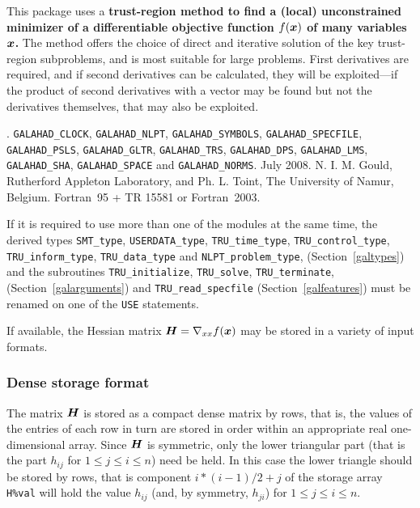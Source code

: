 \documentclass{galahad}
\newcommand{\packagename}{TRU}
\newcommand{\fullpackagename}{\libraryname\_\packagename}
\begin{document}
\galheader


\galsummary
This package uses a {\bf trust-region method to find a (local)
unconstrained minimizer of a differentiable objective function $f({\bm{x}})$
of many variables ${\bm{x}}$.} The method offers the choice of direct
and iterative solution of the key trust-region subproblems, and
is most suitable for large problems. First derivatives are required,
and if second derivatives can be calculated, they will be exploited---if
the product of second derivatives with a vector may be found but
not the derivatives themselves, that may also be exploited.


\galattributes
\galversions{\tt  \fullpackagename\_single, \fullpackagename\_double}.
\galuses
{\tt GALAHAD\_CLOCK},
{\tt GALAHAD\_NLPT},
{\tt GALAHAD\_SY\-M\-BOLS},
{\tt GALAHAD\_SPECFILE},
{\tt GALAHAD\_PSLS},
{\tt GALAHAD\_GLTR},
{\tt GALAHAD\_TRS},
{\tt GALAHAD\_DPS},
{\tt GALAHAD\_LMS},
{\tt GALAHAD\_SHA},
{\tt GALAHAD\_SPACE} and
{\tt GALAHAD\_NORMS}.
\galdate July 2008.
\galorigin N. I. M. Gould, Rutherford Appleton Laboratory,
and Ph. L. Toint, The University of Namur, Belgium.
\gallanguage Fortran~95 + TR 15581 or Fortran~2003.


\galhowto



\noindent
If it is required to use more than one of the modules at the same time, 
the derived types
{\tt SMT\_type},
{\tt USERDATA\_type},
{\tt \packagename\_time\_\-type},
{\tt \packagename\_control\_type},
{\tt \packagename\_inform\_type},
{\tt \packagename\_data\_type}
and
{\tt NLPT\_problem\_type},
(Section~\ref{galtypes})
and the subroutines
{\tt \packagename\_initialize},
{\tt \packagename\_\-solve},
{\tt \packagename\_terminate},
(Section~\ref{galarguments})
and
{\tt \packagename\_read\_specfile}
(Section~\ref{galfeatures})
must be renamed on one of the {\tt USE} statements.


\galmatrix
If available, the Hessian matrix ${\bm{H}} = \nabla_{xx} f({\bm{x}})$
may be stored in a variety of input formats.

\subsubsection{Dense storage format}\label{dense}
The matrix ${\bm{H}}$ is stored as a compact
dense matrix by rows, that is, the values of the entries of each row in turn are
stored in order within an appropriate real one-dimensional array.
Since ${\bm{H}}$ is symmetric, only the lower triangular part (that is the part
$h_{ij}$ for $1 \leq j \leq i \leq n$) need be held. In this case
the lower triangle should be stored by rows, that is
component $i \ast (i-1)/2 + j$ of the storage array {\tt H\%val}
will hold the value $h_{ij}$ (and, by symmetry, $h_{ji}$)
for $1 \leq j \leq i \leq n$.
\end{document}
